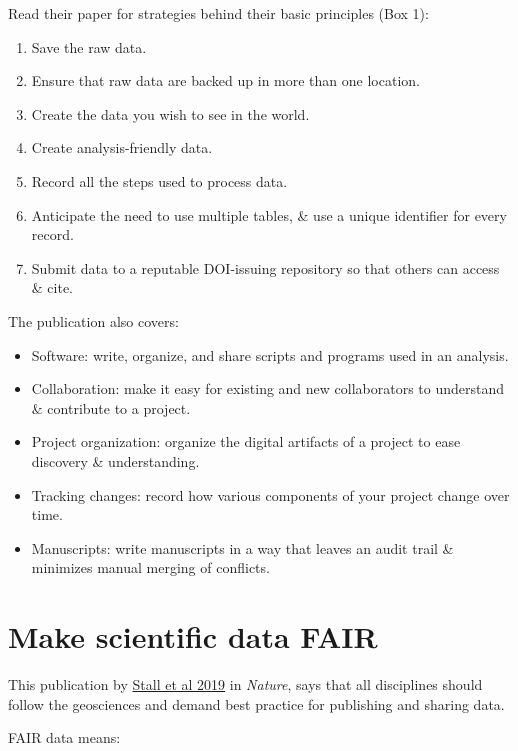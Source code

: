 \documentclass[
  letterpaper,
  DIV=11,
  numbers=noendperiod]{scrreprt}
\providecommand{\tightlist}{%
  \setlength{\itemsep}{0pt}\setlength{\parskip}{0pt}}
\begin{document}
Read their paper for strategies behind their basic principles (Box 1):

\begin{enumerate}
\def\labelenumi{\arabic{enumi}.}
\tightlist
\item
  Save the raw data.
\item
  Ensure that raw data are backed up in more than one location.
\item
  Create the data you wish to see in the world.
\item
  Create analysis-friendly data.
\item
  Record all the steps used to process data.
\item
  Anticipate the need to use multiple tables, \& use a unique identifier
  for every record.
\item
  Submit data to a reputable DOI-issuing repository so that others can
  access \& cite.
\end{enumerate}

The publication also covers:

\begin{itemize}
\tightlist
\item
  Software: write, organize, and share scripts and programs used in an
  analysis.
\item
  Collaboration: make it easy for existing and new collaborators to
  understand \& contribute to a project.
\item
  Project organization: organize the digital artifacts of a project to
  ease discovery \& understanding.
\item
  Tracking changes: record how various components of your project change
  over time.
\item
  Manuscripts: write manuscripts in a way that leaves an audit trail \&
  minimizes manual merging of conflicts.
\end{itemize}

\hypertarget{make-scientific-data-fair}{%
\section{Make scientific data FAIR}\label{make-scientific-data-fair}}

This publication by
\href{https://www.nature.com/articles/d41586-019-01720-7}{Stall et al
2019} in \emph{Nature}, says that all disciplines should follow the
geosciences and demand best practice for publishing and sharing data.

FAIR data means:
\end{document}
